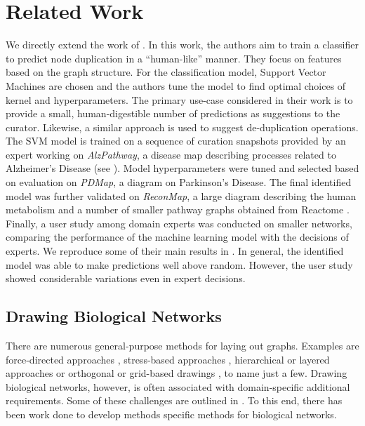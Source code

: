 \documentclass[
	fontsize=10pt, %
	twoside=false, %
	secnumdepth=1, %
  toc=indentunnumbered %
]{kaobook}
\begin{document}
\chapter{Related Work}
\label{sec:related-work}
We directly extend the work of \citeauthor{nielsen_MachineLearningSupport_2019}
\cite{nielsen_MachineLearningSupport_2019}. In this work, the authors aim to
train a classifier to predict node duplication in a ``human-like'' manner. They
focus on features based on the graph structure. For the classification model,
Support Vector Machines are chosen and the authors tune the model to find
optimal choices of kernel and hyperparameters. The primary use-case considered
in their work is to provide a small, human-digestible number of predictions as
suggestions to the curator. Likewise, a similar approach is used to suggest
de-duplication operations. The SVM model is trained on a sequence of curation
snapshots provided by an expert working on \textit{AlzPathway}, a disease map
describing processes related to Alzheimer's Disease (see ).
Model hyperparameters were tuned and selected based on evaluation on
\textit{PDMap}, a diagram on Parkinson's Disease. The final identified model was
further validated on \textit{ReconMap}, a large diagram describing the human
metabolism and a number of smaller pathway graphs obtained from Reactome
\cite{joshi-tope_ReactomeKnowledgebaseBiological_2005}. Finally, a user study
among domain experts was conducted on smaller networks, comparing the
performance of the machine learning model
with the decisions of experts. We reproduce some of their main results in
. In general, the
identified model was able to make predictions well above random. However, the
user study showed considerable variations even in expert decisions.



\section{Drawing Biological Networks}

There are numerous general-purpose methods for laying out graphs. Examples are
force-directed approaches \cite{kobourov_ForceDirectedDrawingAlgorithms_2013},
stress-based approaches \cite{gansner_GraphDrawingStress_2005}, hierarchical or
layered approaches \cite{healy_HierarchicalDrawingAlgorithms_2013} or orthogonal
or grid-based drawings \cite{duncan_PlanarOrthogonalPolyline_2013}, to name just
a few. Drawing biological networks, however, is often associated with
domain-specific additional requirements. Some of these challenges are outlined
in . To this end, there has been work done to develop
methods specific methods for biological networks.
\end{document}
